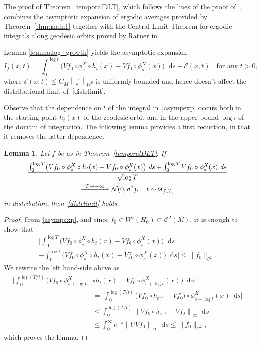 \documentclass[JEP,XML,SOM,NoEqCountersInSection,Unicode,published]{cedram}
\newcommand\To[1]{\mathchoice{\xrightarrow{\kern4pt#1\kern3pt}}{\stackrel{#1}{\longrightarrow}}{}{}}
\newcommand{\nnorm}[1]{\lVert#1\rVert}
\newcommand {\cN}{\mathcal{N}}
\newcommand*{\diff}{\mathop{}\!\mathrm{d}}
\newcommand{\norm}[1]{\left\lVert#1\right\rVert}
\newtheorem {lemma}[theorem]{Lemma}
\theoremstyle{definition}
\begin{document}
\begin{appendix}
The proof of Theorem~\ref{temporalDLT}, which follows the lines of the proof of~\cite[Th.\,5.1]{Dolgopyat-Sarig}, combines the asymptotic expansion of ergodic averages provided by Theorem~\ref{thm:main1} together with the Central Limit Theorem for ergodic integrals along geodesic orbits proved by Ratner in \cite{Rat:CLT}.

Lemma \ref{lemma:log_growth} yields the asymptotic expansion
\begin{equation}
\label{asympexp}
I_f(x,t)=\int_0^{\log{t}}\bigl(Vf_0\circ \phi^{X}_s\circ h_t(x)-Vf_0\circ \phi_s^{X}(x) \bigr)\diff s +\mathcal{E}(x,t) \quad\text{for any }t>0,
\end{equation}
where $\mathcal{E}(x,t) \leq C_M\norm{f}_{W^6}$ is uniformly bounded and hence doesn't affect the distributional limit of~\eqref{distrlimit}.

Observe that the dependence on $t$ of the integral in~\eqref{asympexp} occurs both in the starting point $h_t(x)$ of the geodesic orbit and in the upper bound $\log{t}$ of the domain of integration. The following lemma provides a first reduction, in that it removes the latter dependence.

\begin{lemma}
Let $f$ be as in Theorem~\ref{temporalDLT}. If
\begin{multline*}
\frac{\int_0^{\log{T}}\bigl(Vf_0\circ \phi^{X}_s\circ h_t(x)-Vf_0\circ \phi_s^{X}(x) \bigr)\;\emph{d}s+\int_0^{\log{T}}Vf_0\circ\phi^{X}_s(x)\;\emph{d}s}{\sqrt{\log{T}}}\\
\To{T\to+\infty}\cN(0,\sigma^{2}), \quad
 t\sim \mathcal{U}_{[0,T]}
\end{multline*}
in distribution, then~\eqref{distrlimit} holds.
\end{lemma}
\begin{proof}
From \eqref{asympexp}, and since $f_0 \in W^4(H_0) \subset \mathscr{C}^2(M)$, it is enough to show that
\begin{multline*}
\biggl\lvert \int_0^{\log{T}}\bigl(Vf_0\circ \phi^{X}_s\circ h_t(x)-Vf_0\circ \phi_s^{X}(x) \bigr) \diff s \\
- \int_0^{\log{t}}\bigl(Vf_0\circ \phi^{X}_s\circ h_t(x)-Vf_0\circ \phi_s^{X}(x) \bigr) \diff s \biggr \rvert \leq \nnorm{f_0}_{\mathscr{C}^2}.
\end{multline*}
We rewrite the left hand-side above as
\begin{align*}
\biggl\lvert \int_0^{\log{(T/t)}}\bigl(Vf_0\circ \phi^{X}_{s+ \log t}&\circ h_t(x)-Vf_0\circ \phi_{s+\log t}^{X}(x) \bigr) \diff s \biggr\rvert\\
&= \biggl\lvert \int_0^{\log{(T/t)}}\bigl(Vf_0\circ h_{e^{-s}} - Vf_0 \bigr) \circ \phi^{X}_{s+ \log t}(x) \diff s \biggr\rvert\\
&\leq \int_0^{\log{(T/t)}} \norm{Vf_0\circ h_{e^{-s}} - Vf_0}_{\infty} \diff s \\
&\leq \int_0^{\infty} e^{-s} \norm{UVf_0}_{\infty} \diff s \leq \nnorm{f_0}_{\mathscr{C}^2},
\end{align*}
which proves the lemma.
\end{proof}


\end{appendix}
\end{document}
